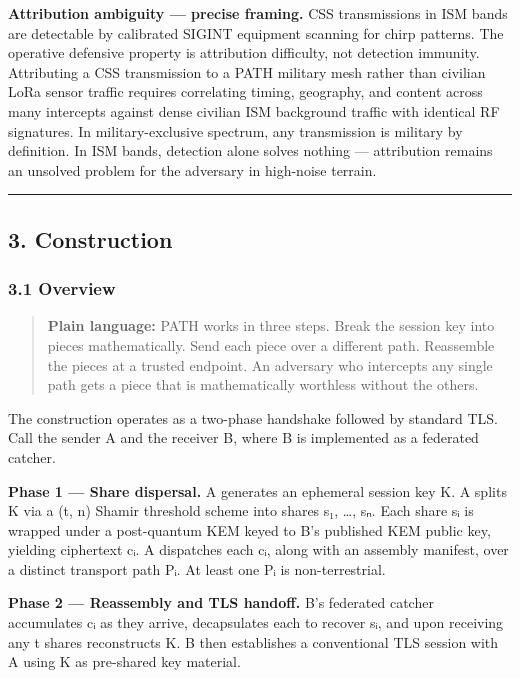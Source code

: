 \documentclass[
  11pt,
]{article}
\begin{document}
\textbf{Attribution ambiguity --- precise framing.} CSS transmissions in
ISM bands are detectable by calibrated SIGINT equipment scanning for
chirp patterns. The operative defensive property is attribution
difficulty, not detection immunity. Attributing a CSS transmission to a
PATH military mesh rather than civilian LoRa sensor traffic requires
correlating timing, geography, and content across many intercepts
against dense civilian ISM background traffic with identical RF
signatures. In military-exclusive spectrum, any transmission is military
by definition. In ISM bands, detection alone solves nothing ---
attribution remains an unsolved problem for the adversary in high-noise
terrain.

\begin{center}\rule{0.5\linewidth}{0.5pt}\end{center}

\hypertarget{construction}{%
\subsection{3. Construction}\label{construction}}

\hypertarget{overview}{%
\subsubsection{3.1 Overview}\label{overview}}

\begin{quote}
\textbf{Plain language:} PATH works in three steps. Break the session
key into pieces mathematically. Send each piece over a different path.
Reassemble the pieces at a trusted endpoint. An adversary who intercepts
any single path gets a piece that is mathematically worthless without
the others.
\end{quote}

The construction operates as a two-phase handshake followed by standard
TLS. Call the sender A and the receiver B, where B is implemented as a
federated catcher.

\textbf{Phase 1 --- Share dispersal.} A generates an ephemeral session
key K. A splits K via a (t, n) Shamir threshold scheme into shares s₁,
\ldots, sₙ. Each share sᵢ is wrapped under a post-quantum KEM keyed to
B's published KEM public key, yielding ciphertext cᵢ. A dispatches each
cᵢ, along with an assembly manifest, over a distinct transport path Pᵢ.
At least one Pᵢ is non-terrestrial.

\textbf{Phase 2 --- Reassembly and TLS handoff.} B's federated catcher
accumulates cᵢ as they arrive, decapsulates each to recover sᵢ, and upon
receiving any t shares reconstructs K. B then establishes a conventional
TLS session with A using K as pre-shared key material.
\end{document}
